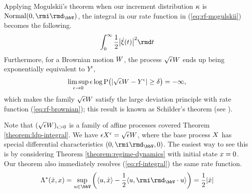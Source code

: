 \begin{example}
  \label{example:brownian}
  Applying Mogulskii's theorem when our increment distribution $\kappa$ is $\operatorname{Normal}(0,\id_\vecSpace)$, the integral in our rate function in (\ref{eq:rf-mogulskii}) becomes the following.
  \begin{equation}
    \label{eq:rf-brownian}
    \int_0^\infty \frac12\big|\dot\pathVar(t)\big|^2 \rmd t
  \end{equation}
  Furthermore, for a Brownian motion $W$, the process $\sqrt\epsilon W$ ends up being exponentially equivalent to $Y^\epsilon$,
  \begin{equation*}
    \limsup_{\epsilon\rightarrow0} \epsilon\log {\operatorname{P}}\big( |\sqrt\epsilon W - Y^\epsilon| \geq \delta \big) = -\infty,
  \end{equation*}
  which makes the family $\sqrt\epsilon W$ satisfy the large deviation principle with rate function (\ref{eq:rf-brownian}); this result is known as Schilder's theorem (see \cite[Theorem 5.2.3]{dembo2010}).

  Note that $(\sqrt\epsilon W)_{\epsilon>0}$ is a family of affine processes covered Theorem \ref{theorem:ldp-integral}.
  We have $\epsilon X^\epsilon = \sqrt\epsilon W$, where the base process $X$ has special differential characteristics $(0, \id_\vecSpace, 0)$.
  The easiest way to see this is by considering Theorem \ref{theorem:regime-dynamics} with initial state $x = 0$.
  Our theorem also immediately resolves (\ref{eq:rf-integral}) the same rate function.
  \begin{equation*}
    \ode^*(\dot\stateVar, \stateVar)
    = \sup_{\momentVar \in \vecSpace} \bigg( \prj{\momentVar}{\dot\stateVar} - \frac12\prj{\momentVar}{\id_\vecSpace\cdot \momentVar} \bigg) = \frac12 |\dot\stateVar|
  \end{equation*}
\end{example}
